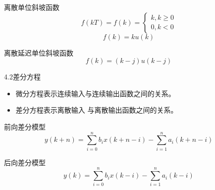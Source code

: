 \begin{frame}
\begin{block}{离散单位斜坡函数}
\begin{equation*}
f(kT)=f(k)=\begin{cases}
k,k\geq 0\\
0,k<0
\end{cases}
\end{equation*}
\[f(k)=ku(k)\]
\end{block}
\begin{block}{离散延迟单位斜坡函数}
\begin{equation*}
f(k)=(k-j)u(k-j)
\end{equation*}
\end{block}
\end{frame}

\begin{frame}{4.2差分方程}
\begin{block}{}
\begin{itemize}
\item 微分方程表示连续输入与连续输出函数之间的关系。
\item 差分方程表示离散输入 与离散输出函数之间的关系。
\end{itemize}
\end{block}
\begin{block}{前向差分模型}
\begin{equation*}
y(k+n)=\sum\limits _{i=0}^nb_ix(k+n-i)-\sum\limits_{i=1}^na_i(k+n-i)
\end{equation*}
\end{block}
\end{frame}

\begin{frame}
\begin{block}{后向差分模型}
\begin{equation*}
y(k)=\sum\limits _{i=0}^nb_ix(k-i)-\sum\limits_{i=1}^na_i(k-i)
\end{equation*}
\end{block}
\end{frame}